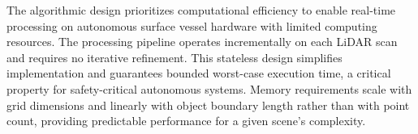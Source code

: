 \documentclass{erauthesis}
\begin{document}
The algorithmic design prioritizes computational efficiency to enable real-time processing on autonomous surface vessel hardware with limited computing resources. The processing pipeline operates incrementally on each LiDAR scan and requires no iterative refinement. This stateless design simplifies implementation and guarantees bounded worst-case execution time, a critical property for safety-critical autonomous systems. Memory requirements scale with grid dimensions and linearly with object boundary length rather than with point count, providing predictable performance for a given scene’s complexity.

\end{document}
